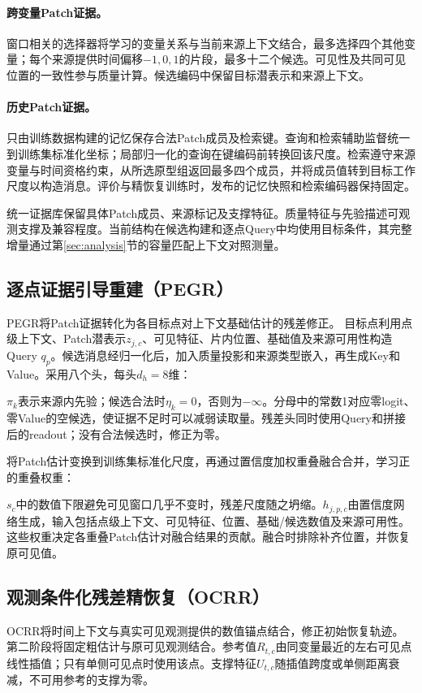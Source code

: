 \paragraph{跨变量Patch证据。}
窗口相关的选择器将学习的变量关系与当前来源上下文结合，最多选择四个其他变量；每个来源提供时间偏移$-1,0,1$的片段，最多十二个候选。可见性及共同可见位置的一致性参与质量计算。候选编码中保留目标潜表示和来源上下文。

\paragraph{历史Patch证据。}
只由训练数据构建的记忆保存合法Patch成员及检索键。查询和检索辅助监督统一到训练集标准化坐标；局部归一化的查询在键编码前转换回该尺度。检索遵守来源变量与时间资格约束，从所选原型组返回最多四个成员，并将成员值转到目标工作尺度以构造消息。评价与精恢复训练时，发布的记忆快照和检索编码器保持固定。

统一证据库保留具体Patch成员、来源标记及支撑特征。质量特征与先验描述可观测支撑及兼容程度。当前结构在候选构建和逐点Query中均使用目标条件，其完整增量通过第\ref{sec:analysis}节的容量匹配上下文对照测量。

\subsection{逐点证据引导重建（PEGR）}\label{sec:pegr}
PEGR将Patch证据转化为各目标点对上下文基础估计的残差修正。
目标点利用点级上下文、Patch潜表示$z_{j,c}$、可见特征、片内位置、基础值及来源可用性构造Query $q_p$。候选消息经归一化后，加入质量投影和来源类型嵌入，再生成Key和Value。采用八个头，每头$d_h=8$维：

$\pi_k$表示来源内先验；候选合法时$\eta_k=0$，否则为$-\infty$。分母中的常数1对应零logit、零Value的空候选，使证据不足时可以减弱读取量。残差头同时使用Query和拼接后的readout；没有合法候选时，修正为零。

将Patch估计变换到训练集标准化尺度，再通过置信度加权重叠融合合并，学习正的重叠权重：

$s_c$中的数值下限避免可见窗口几乎不变时，残差尺度随之坍缩。$h_{j,p,c}$由置信度网络生成，输入包括点级上下文、可见特征、位置、基础/候选数值及来源可用性。这些权重决定各重叠Patch估计对融合结果的贡献。融合时排除补齐位置，并恢复原可见值。

\subsection{观测条件化残差精恢复（OCRR）}\label{sec:ocrr}
OCRR将时间上下文与真实可见观测提供的数值锚点结合，修正初始恢复轨迹。
第二阶段将固定粗估计与原可见观测结合。参考值$R_{t,c}$由同变量最近的左右可见点线性插值；只有单侧可见点时使用该点。支撑特征$U_{t,c}$随插值跨度或单侧距离衰减，不可用参考的支撑为零。

